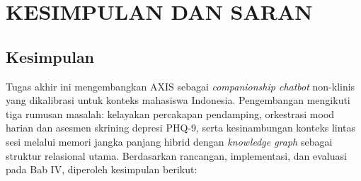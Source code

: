 
\chapter{KESIMPULAN DAN SARAN}
\label{ch:kesimpulan}

\section{Kesimpulan}
\label{sec:kesimpulan}

Tugas akhir ini mengembangkan AXIS sebagai \textit{companionship chatbot}
non-klinis yang dikalibrasi untuk konteks mahasiswa Indonesia. Pengembangan
mengikuti tiga rumusan masalah: kelayakan percakapan pendamping, orkestrasi
mood harian dan asesmen skrining depresi PHQ-9, serta kesinambungan konteks
lintas sesi melalui memori jangka panjang hibrid dengan \textit{knowledge graph}
sebagai struktur relasional utama. Berdasarkan rancangan, implementasi, dan
evaluasi pada Bab IV, diperoleh kesimpulan berikut:

